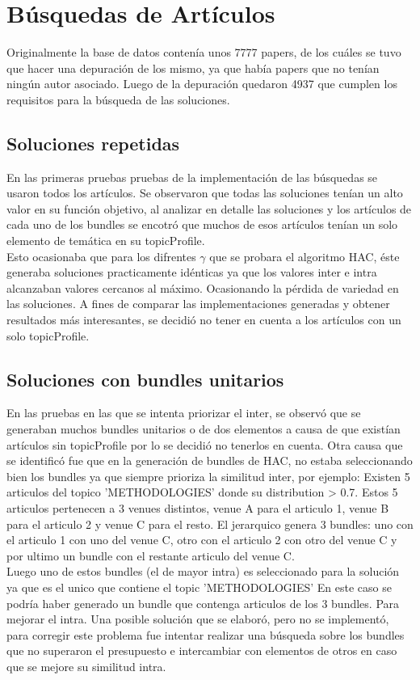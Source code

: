 \section{Búsquedas de Artículos}
Originalmente la base de datos contenía unos 7777 papers, de los cuáles se tuvo que hacer una depuración de los mismo, ya que había papers que no tenían ningún autor asociado. Luego de la depuración quedaron 4937 que cumplen los requisitos para la búsqueda de las soluciones.
\subsection{Soluciones repetidas}
En las primeras pruebas pruebas de la implementación de las búsquedas se usaron todos los artículos. Se observaron que todas las soluciones tenían un alto valor en su función objetivo, al analizar en detalle las soluciones y los artículos de cada uno de los bundles se encotró que muchos de esos artículos tenían un solo elemento de temática en su topicProfile.\\
Esto ocasionaba que para los difrentes $\gamma$ que se probara el algoritmo HAC, éste generaba soluciones practicamente idénticas ya que los valores inter e intra alcanzaban valores cercanos al máximo. Ocasionando la pérdida de variedad en las soluciones. A fines de comparar las implementaciones generadas y obtener resultados más interesantes, se decidió no tener en cuenta a los artículos con un solo topicProfile.\\
\subsection{Soluciones con bundles unitarios}
En las pruebas en las que se intenta priorizar el inter, se observó que se generaban muchos bundles unitarios o de dos elementos a causa de que existían artículos sin topicProfile por lo se decidió no tenerlos en cuenta. Otra causa que se identificó fue que en la generación de bundles de HAC, no estaba seleccionando bien los bundles ya que siempre prioriza la similitud inter, por ejemplo: Existen 5 articulos del topico 'METHODOLOGIES' donde su distribution > 0.7. Estos 5 articulos pertenecen a 3 venues distintos, venue A para el articulo 1, venue B para el articulo 2 y venue C para el resto. El jerarquico genera 3 bundles: uno con el articulo 1 con uno del venue C, otro con el articulo 2 con otro del venue C y por ultimo un bundle con el restante articulo del venue C.\\
Luego uno de estos bundles (el de mayor intra) es seleccionado para la solución ya que es el unico que contiene el topic 'METHODOLOGIES'  En este caso se podría haber generado un bundle que contenga articulos de los 3 bundles. Para mejorar el intra. Una posible solución que se elaboró, pero no se implementó, para corregir este problema fue intentar realizar una búsqueda sobre los bundles que no superaron el presupuesto e intercambiar con elementos de otros en caso que se mejore su similitud intra.
